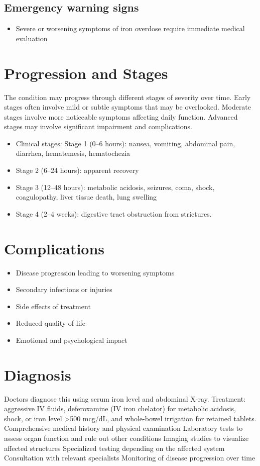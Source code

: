 \subsection{Emergency warning signs}
\begin{itemize}[noitemsep]
  \item Severe or worsening symptoms of iron overdose require immediate medical evaluation
\end{itemize}
\section{Progression and Stages}
The condition may progress through different stages of severity over time. Early stages often involve mild or subtle symptoms that may be overlooked. Moderate stages involve more noticeable symptoms affecting daily function. Advanced stages may involve significant impairment and complications.

\begin{itemize}[noitemsep]
  \item Clinical stages: Stage 1 (0--6 hours): nausea, vomiting, abdominal pain, diarrhea, hematemesis, hematochezia
  \item Stage 2 (6--24 hours): apparent recovery
  \item Stage 3 (12--48 hours): metabolic acidosis, seizures, coma, shock, coagulopathy, liver tissue death, lung swelling
  \item Stage 4 (2--4 weeks): digestive tract obstruction from strictures.
\end{itemize}
\section{Complications}
\begin{itemize}[noitemsep]
  \item Disease progression leading to worsening symptoms
  \item Secondary infections or injuries
  \item Side effects of treatment
  \item Reduced quality of life
  \item Emotional and psychological impact
\end{itemize}
\section{Diagnosis}
Doctors diagnose this using serum iron level and abdominal X-ray. Treatment: aggressive IV fluids, deferoxamine (IV iron chelator) for metabolic acidosis, shock, or iron level >500 mcg/dL, and whole-bowel irrigation for retained tablets. Comprehensive medical history and physical examination Laboratory tests to assess organ function and rule out other conditions Imaging studies to visualize affected structures Specialized testing depending on the affected system Consultation with relevant specialists Monitoring of disease progression over time

